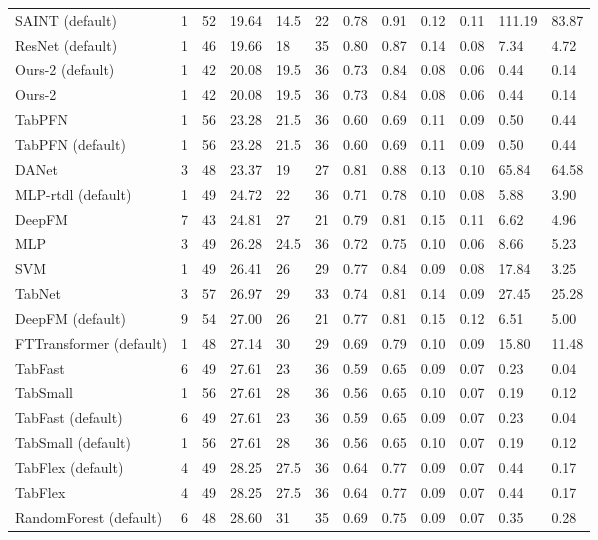\begin{tabular}{lllllrllllll}
SAINT (default) & 1 & 52 & 19.64 & 14.5 & 22 & 0.78 & 0.91 & 0.12 & 0.11 & 111.19 & 83.87 \\
ResNet (default) & 1 & 46 & 19.66 & 18 & 35 & 0.80 & 0.87 & 0.14 & 0.08 & 7.34 & 4.72 \\
Ours-2 (default) & 1 & 42 & 20.08 & 19.5 & 36 & 0.73 & 0.84 & 0.08 & 0.06 & 0.44 & 0.14 \\
Ours-2 & 1 & 42 & 20.08 & 19.5 & 36 & 0.73 & 0.84 & 0.08 & 0.06 & 0.44 & 0.14 \\
TabPFN & 1 & 56 & 23.28 & 21.5 & 36 & 0.60 & 0.69 & 0.11 & 0.09 & 0.50 & 0.44 \\
TabPFN (default) & 1 & 56 & 23.28 & 21.5 & 36 & 0.60 & 0.69 & 0.11 & 0.09 & 0.50 & 0.44 \\
DANet & 3 & 48 & 23.37 & 19 & 27 & 0.81 & 0.88 & 0.13 & 0.10 & 65.84 & 64.58 \\
MLP-rtdl (default) & 1 & 49 & 24.72 & 22 & 36 & 0.71 & 0.78 & 0.10 & 0.08 & 5.88 & 3.90 \\
DeepFM & 7 & 43 & 24.81 & 27 & 21 & 0.79 & 0.81 & 0.15 & 0.11 & 6.62 & 4.96 \\
MLP & 3 & 49 & 26.28 & 24.5 & 36 & 0.72 & 0.75 & 0.10 & 0.06 & 8.66 & 5.23 \\
SVM & 1 & 49 & 26.41 & 26 & 29 & 0.77 & 0.84 & 0.09 & 0.08 & 17.84 & 3.25 \\
TabNet & 3 & 57 & 26.97 & 29 & 33 & 0.74 & 0.81 & 0.14 & 0.09 & 27.45 & 25.28 \\
DeepFM (default) & 9 & 54 & 27.00 & 26 & 21 & 0.77 & 0.81 & 0.15 & 0.12 & 6.51 & 5.00 \\
FTTransformer (default) & 1 & 48 & 27.14 & 30 & 29 & 0.69 & 0.79 & 0.10 & 0.09 & 15.80 & 11.48 \\
TabFast & 6 & 49 & 27.61 & 23 & 36 & 0.59 & 0.65 & 0.09 & 0.07 & 0.23 & 0.04 \\
TabSmall & 1 & 56 & 27.61 & 28 & 36 & 0.56 & 0.65 & 0.10 & 0.07 & 0.19 & 0.12 \\
TabFast (default) & 6 & 49 & 27.61 & 23 & 36 & 0.59 & 0.65 & 0.09 & 0.07 & 0.23 & 0.04 \\
TabSmall (default) & 1 & 56 & 27.61 & 28 & 36 & 0.56 & 0.65 & 0.10 & 0.07 & 0.19 & 0.12 \\
TabFlex (default) & 4 & 49 & 28.25 & 27.5 & 36 & 0.64 & 0.77 & 0.09 & 0.07 & 0.44 & 0.17 \\
TabFlex & 4 & 49 & 28.25 & 27.5 & 36 & 0.64 & 0.77 & 0.09 & 0.07 & 0.44 & 0.17 \\
RandomForest (default) & 6 & 48 & 28.60 & 31 & 35 & 0.69 & 0.75 & 0.09 & 0.07 & 0.35 & 0.28 \\

\end{tabular}
